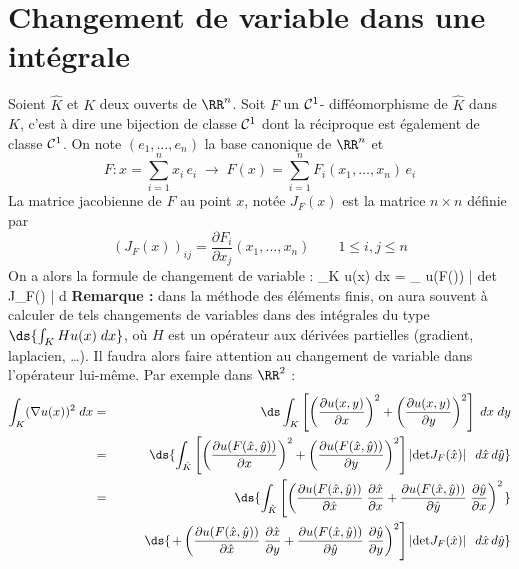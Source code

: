 \section{Changement de variable dans une int\'egrale}
\noindent
%
%
Soient $\hat{K}$ et $K$ deux ouverts de $\RR^n$. Soit $F$ un ${\cal C}^1$- diff\'eomorphisme de $\hat{K}$ dans $K$, c'est \`a dire une bijection de classe ${\cal C}^1$ dont la r\'eciproque est \'egalement de classe ${\cal C}^1$. On note $(e_1,\ldots,e_n)$ la base canonique de $\RR^n$ et 
$$
F : x=\sum_{i=1}^n x_i \, e_i \; \longrightarrow \; F(x) = \sum_{i=1}^n F_i(x_1,\ldots,x_n) \, e_i
$$
La matrice jacobienne de $F$ au point $x$, not\'ee $J_F(x)$ est la matrice $n\times n$ d\'efinie par
$$
\left( J_F(x) \right)_{ij} = \frac{\partial F_i}{\partial x_j}(x_1,\ldots,x_n)
\qquad 1\le i,j \le n
$$
%
%
On a alors la formule de changement de variable :
\be
\int_K u(x)\; dx = \int_{} u(F())\; \left| \hbox{det } J_F() \right| \; d
\ee
%
%
{\bf Remarque :} dans la m\'ethode des \'el\'ements finis, on aura souvent \`a calculer de tels changements de variables dans des int\'egrales du type $\ds{ \int_K Hu(x)\; dx }$, o\`u $H$ est un op\'erateur aux d\'eriv\'ees partielles (gradient, laplacien, \ldots). Il faudra alors faire attention au changement de variable dans l'op\'erateur lui-m\^eme. Par exemple dans $\RR^2$ :
%
\begin{eqnarray*}
\int_K (\nabla u(x))^2\; dx & = & {\ds \int_K \left[ \left(\frac{\partial u(x,y)}{\partial x} \right)^2 + \left(\frac{\partial u(x,y)}{\partial y} \right)^2 \right]\; dx\; dy }\\
%
& = & \ds{ \int_{\hat{K}} \left[ \left(\frac{\partial u(F(\hat{x},\hat{y}))}{\partial x}  \right)^2 + 
\left(\frac{\partial u(F(\hat{x},\hat{y}))}{\partial y} \right)^2 \right] \left| \hbox{det} J_F(\hat{x}) \right| \; \; d\hat{x}\, d\hat{y}
}\\
%
& = & \ds{ \int_{\hat{K}} \left[ \left(\frac{\partial u(F(\hat{x},\hat{y}))}{\partial
 \hat{x}} \;  \frac{\partial \hat{x}}{\partial x} + \frac{\partial u(F(\hat{x},\hat{y}))}{\partial \hat{y}} \; \frac{\partial \hat{y}}{\partial x} \right)^2  \right.
}\\
%
& & \qquad
 \ds{ \left. +
\left(\frac{\partial u(F(\hat{x},\hat{y}))}{\partial \hat{x}} \;  \frac{\partial \hat{x}}{\partial y} + \frac{\partial u(F(\hat{x},\hat{y}))}{\partial \hat{y}} \; \frac{\partial \hat{y}}{\partial y} \right)^2 \right] \left| \hbox{det} J_F(\hat{x}) \right| \; \; d\hat{x}\, d\hat{y}
}
\end{eqnarray*}
